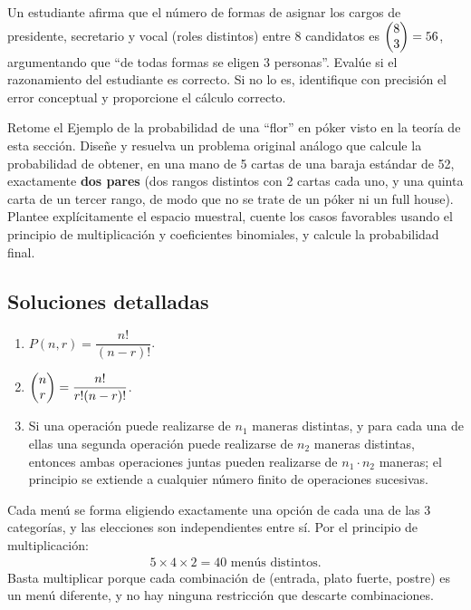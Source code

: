 \begin{problema}
	\label{prob:3007304}
	Un estudiante afirma que el número de formas de asignar los cargos de presidente, secretario y vocal (roles distintos) entre 8 candidatos es $\begin{pmatrix} 8 \\ 3\end{pmatrix} = 56$, argumentando que ``de todas formas se eligen 3 personas''. Evalúe si el razonamiento del estudiante es correcto. Si no lo es, identifique con precisión el error conceptual y proporcione el cálculo correcto.
\end{problema}

\begin{problema}
	\label{prob:b53268b}
	Retome el Ejemplo de la probabilidad de una ``flor'' en póker visto en la teoría de esta sección. Diseñe y resuelva un problema original análogo que calcule la probabilidad de obtener, en una mano de 5 cartas de una baraja estándar de 52, exactamente \textbf{dos pares} (dos rangos distintos con 2 cartas cada uno, y una quinta carta de un tercer rango, de modo que no se trate de un póker ni un full house). Plantee explícitamente el espacio muestral, cuente los casos favorables usando el principio de multiplicación y coeficientes binomiales, y calcule la probabilidad final.
\end{problema}

\subsection*{Soluciones detalladas}

\begin{solproblema}[prob:6369f2a]
	\begin{enumerate}
		\item $P(n,r) = \dfrac{n!}{(n-r)!}$.
		\item $\begin{pmatrix} n \\ r\end{pmatrix} = \dfrac{n!}{r!(n-r)!}$.
		\item Si una operación puede realizarse de $n_1$ maneras distintas, y para cada una de ellas una segunda operación puede realizarse de $n_2$ maneras distintas, entonces ambas operaciones juntas pueden realizarse de $n_1 \cdot n_2$ maneras; el principio se extiende a cualquier número finito de operaciones sucesivas.
	\end{enumerate}
\end{solproblema}

\begin{solproblema}[prob:4f6f981]
	Cada menú se forma eligiendo exactamente una opción de cada una de las 3 categorías, y las elecciones son independientes entre sí. Por el principio de multiplicación:
	\begin{align}
		5 \times 4 \times 2 = 40 \text{ menús distintos.}
	\end{align}
	Basta multiplicar porque cada combinación de (entrada, plato fuerte, postre) es un menú diferente, y no hay ninguna restricción que descarte combinaciones.
\end{solproblema}

